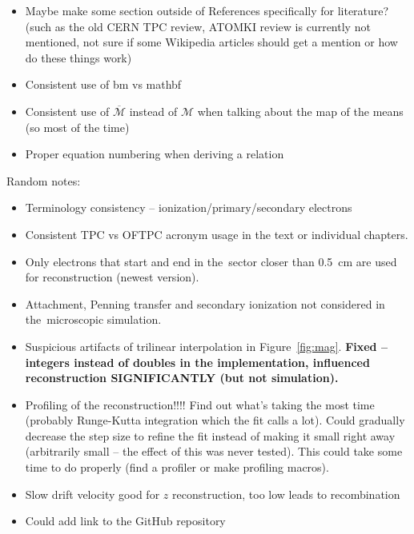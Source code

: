 {\begin{itemize}[topsep=4pt,itemsep=2pt]
				\item Maybe make some section outside of References specifically for literature? (such as the old CERN TPC review, ATOMKI review is currently not mentioned, not sure if some Wikipedia articles should get a mention or how do these things work)
				\item Consistent use of bm vs mathbf
				\item Consistent use of $\overbar{\mathcal{M}}$ instead of $\mathcal{M}$ when talking about the map of the means (so most of the time)
				\item Proper equation numbering when deriving a relation
			\end{itemize}
			Random notes:
			\begin{itemize}[topsep=4pt,itemsep=2pt]
				\item Terminology consistency -- ionization/primary/secondary electrons
				\item Consistent \ac{TPC} vs \ac{OFTPC} acronym usage in the text or individual chapters.
				\item Only electrons that start and end in the~sector closer than 0.5~cm are used for reconstruction (newest version).
				\item Attachment, Penning transfer and secondary ionization not considered in the~microscopic simulation.
				\item Suspicious artifacts of trilinear interpolation in Figure~\ref{fig:mag}. \textbf{Fixed -- integers instead of doubles in the implementation, influenced reconstruction SIGNIFICANTLY (but not simulation).}
				\item Profiling of the reconstruction!!!! Find out what's taking the most time (probably Runge-Kutta integration which the fit calls a lot). Could gradually decrease the step size to refine the fit instead of making it small right away (arbitrarily small -- the effect of this was never tested). This could take some time to do properly (find a profiler or make profiling macros).
				\item Slow drift velocity good for $z$ reconstruction, too low leads to recombination
				\item Could add link to the GitHub repository
			\end{itemize}
		}
